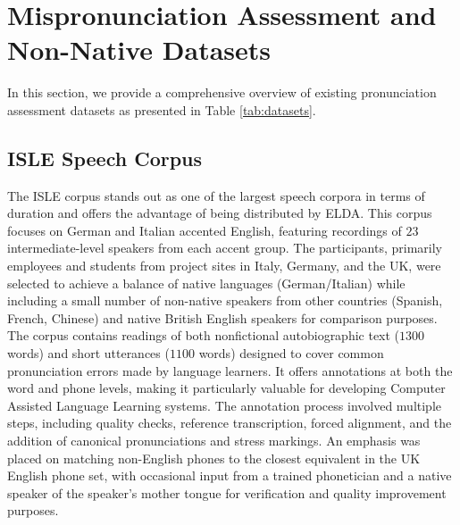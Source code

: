 \section{Mispronunciation Assessment and Non-Native Datasets}
\label{sec:datasets}


In this section, we provide a comprehensive overview of existing pronunciation assessment datasets as presented in Table \ref{tab:datasets}.



\subsection{ISLE Speech Corpus \cite{ISLE}}

The ISLE corpus stands out as one of the largest speech corpora in terms of duration and offers the advantage of being distributed by ELDA. This corpus focuses on German and Italian accented English, featuring recordings of $23$ intermediate-level speakers from each accent group. The participants, primarily employees and students from project sites in Italy, Germany, and the UK, were selected to achieve a balance of native languages (German/Italian) while including a small number of non-native speakers from other countries (Spanish, French, Chinese) and native British English speakers for comparison purposes. The corpus contains readings of both nonfictional autobiographic text ($1300$ words) and short utterances ($1100$ words) designed to cover common pronunciation errors made by language learners. It offers annotations at both the word and phone levels, making it particularly valuable for developing Computer Assisted Language Learning systems. The annotation process involved multiple steps, including quality checks, reference transcription, forced alignment, and the addition of canonical pronunciations and stress markings. An emphasis was placed on matching non-English phones to the closest equivalent in the UK English phone set, with occasional input from a trained phonetician and a native speaker of the speaker's mother tongue for verification and quality improvement purposes.

